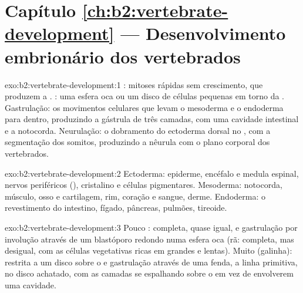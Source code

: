 \section*{Capítulo \ref{ch:b2:vertebrate-development} --- Desenvolvimento embrionário dos vertebrados}

\begin{solution}{exo:b2:vertebrate-development:1}
: mitoses rápidas sem crescimento, que produzem a .
: uma esfera oca ou um disco de células pequenas em torno da
. Gastrulação: os movimentos celulares que levam o mesoderma e
o endoderma para dentro, produzindo a gástrula de três camadas, com uma
cavidade intestinal e a notocorda. Neurulação: o dobramento do
ectoderma dorsal no , com a segmentação dos somitos,
produzindo a nêurula com o plano corporal dos vertebrados.
\end{solution}

\begin{solution}{exo:b2:vertebrate-development:2}
Ectoderma: epiderme, encéfalo e medula espinal, nervos periféricos
(), cristalino e células pigmentares. Mesoderma:
notocorda, músculo, osso e cartilagem, rim, coração e sangue, derme.
Endoderma: o revestimento do intestino, fígado, pâncreas, pulmões,
tireoide.
\end{solution}

\begin{solution}{exo:b2:vertebrate-development:3}
Pouco :  completa, quase igual, e gastrulação por
involução através de um blastóporo redondo numa esfera oca (rã:
completa, mas desigual, com as células vegetativas ricas em 
grandes e lentas). Muito  (galinha):  restrita a um disco
sobre o  e gastrulação através de uma fenda, a linha primitiva,
no disco achatado, com as camadas se espalhando sobre o  em vez
de envolverem uma cavidade.
\end{solution}

